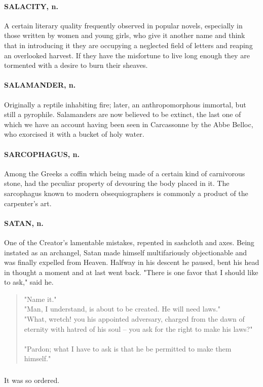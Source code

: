 \documentclass[11pt]{article}
\begin{document}
\paragraph{SALACITY, n.}  A certain literary quality frequently observed in
popular novels, especially in those written by women and young girls,
who give it another name and think that in introducing it they are
occupying a neglected field of letters and reaping an overlooked
harvest.  If they have the misfortune to live long enough they are
tormented with a desire to burn their sheaves.

\paragraph{SALAMANDER, n.}  Originally a reptile inhabiting fire; later, an
anthropomorphous immortal, but still a pyrophile.  Salamanders are now
believed to be extinct, the last one of which we have an account
having been seen in Carcassonne by the Abbe Belloc, who exorcised it
with a bucket of holy water.

\paragraph{SARCOPHAGUS, n.}  Among the Greeks a coffin which being made of a
certain kind of carnivorous stone, had the peculiar property of
devouring the body placed in it.  The sarcophagus known to modern
obsequiographers is commonly a product of the carpenter's art.

\paragraph{SATAN, n.}  One of the Creator's lamentable mistakes, repented in
sashcloth and axes.  Being instated as an archangel, Satan made
himself multifariously objectionable and was finally expelled from
Heaven.  Halfway in his descent he paused, bent his head in thought a
moment and at last went back.  "There is one favor that I should like
to ask," said he.
\begin{quote}   "Name it." \\
  "Man, I understand, is about to be created.  He will need laws." \\
  "What, wretch! you his appointed adversary, charged from the dawn
of eternity with hatred of his soul -- you ask for the right to make
his laws?"\\
\\
"Pardon; what I have to ask is that he be permitted to make them
himself."
\end{quote}
\subparagraph{}   It was so ordered.
\end{document}
